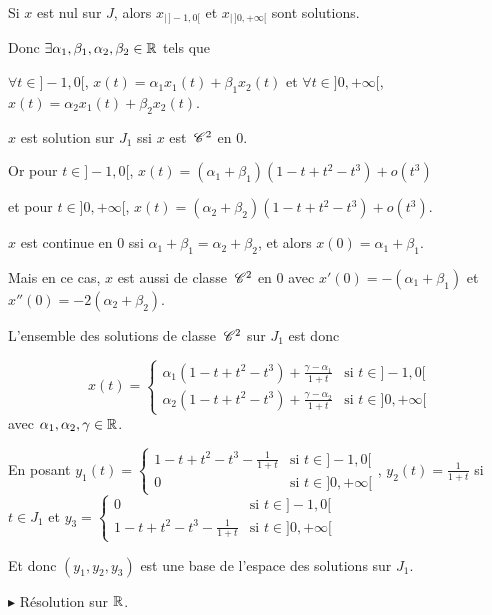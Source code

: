 \begin{exemple}
    Si $x$ est nul sur $J$, alors $x_{|\,]-1, 0[}$ et $x_{|\,]0, +\infty[}$ sont solutions. 

    Donc $\exists \alpha_1, \beta_1, \alpha_2, \beta_2 \in \mathbb{R}$ tels que

    $\forall t \in ]-1, 0[$, $x(t) = \alpha_1 x_1(t) + \beta_1 x_2(t)$ et
    $\forall t \in ]0, +\infty[$, $x(t) = \alpha_2 x_1(t) + \beta_2 x_2(t)$.

    $x$ est solution sur $J_1$ ssi $x$ est $\,\mathscr C^{2}$ en $0$.

    Or pour $t \in ] -1, 0[$, $x(t) = (\alpha_1 + \beta_1)(1 - t + t^2 - t^3) + o(t^3)$ 

    et pour $t \in ]0, +\infty[$, $x(t) = (\alpha_2 + \beta_2)(1 - t + t^2 - t^3) + o(t^3)$.

    $x$ est continue en $0$ ssi $\alpha_1 + \beta_1 = \alpha_2 + \beta_2$, et alors 
    $x(0) = \alpha_1 + \beta_1$.

    Mais en ce cas, $x$ est aussi de classe $\,\mathscr C^{2}$ en $0$ avec $x'(0) = -(\alpha_1 + \beta_1)$ et \\
    $x''(0) = -2(\alpha_2 + \beta_2)$.

    L'ensemble des solutions de classe $\,\mathscr C^{2}$ sur $J_1$ est donc

    $$x(t) = \begin{cases}
        \alpha_1 (1 - t + t^2 - t^3) + \frac{\gamma - \alpha_1} {1 + t} & \text{si } t \in ]-1, 0[ \\
        \alpha_2 (1 - t + t^2 - t^3) + \frac{\gamma - \alpha_2} {1 + t} & \text{si } t \in ]0, +\infty[
    \end{cases}$$ avec 
    $\alpha_1, \alpha_2, \gamma \in \mathbb{R}$.

    En posant $y_1(t) = \begin{cases}
        1 - t + t^2 - t^3 - \frac 1 {1 + t} & \text{si } t \in ]-1, 0[ \\
        0 & \text{si } t \in ]0, +\infty[
    \end{cases}$, $y_2(t) = \frac 1 {1 + t}$ si $t \in J_1$ et 
    $y_3 = \begin{cases}
        0 & \text{si } t \in ]-1, 0[ \\
        1 - t + t^2 - t^3 - \frac 1 {1 + t} & \text{si } t \in ]0, +\infty[
    \end{cases}$

    Et donc $(y_1, y_2, y_3)$ est une base de l'espace des solutions sur 
    $J_1$.

    \lvspace $\blacktriangleright$ Résolution sur $\mathbb{R}$. 


\end{exemple}
